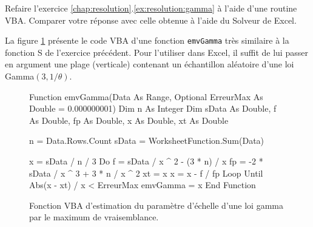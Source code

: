 \begin{exercice}
  Refaire l'exercice \ref{chap:resolution}.\ref{ex:resolution:gamma} à
  l'aide d'une routine VBA. Comparer votre réponse avec celle obtenue
  à l'aide du Solveur de Excel.
  \begin{sol}
    La figure \ref{fig:resolution:emvGamma} présente le code VBA d'une fonction
    \texttt{emvGamma} très similaire à la fonction S de l'exercice
    précédent. Pour l'utiliser dans Excel, il suffit de lui passer en
    argument une plage (verticale) contenant un échantillon aléatoire
    d'une loi Gamma$(3, 1/\theta)$.
    \begin{figure}
      \centering
      \begin{framed}
\begin{Scode}
Function emvGamma(Data As Range, Optional ErreurMax
                  As Double = 0.000000001)
    Dim n As Integer
    Dim sData As Double, f As Double,
        fp As Double, x As Double, xt As Double

    n = Data.Rows.Count
    sData = WorksheetFunction.Sum(Data)

    x = sData / n / 3
    Do
        f = sData / x ^ 2 - (3 * n) / x
        fp = -2 * sData / x ^ 3 + 3 * n / x ^ 2
        xt = x
        x = x - f / fp
    Loop Until Abs(x - xt) / x < ErreurMax
    emvGamma = x
End Function
\end{Scode}
      \end{framed}
      \caption{Fonction VBA d'estimation du paramètre d'échelle d'une
        loi gamma par le maximum de vraisemblance.}
      \label{fig:resolution:emvGamma}
    \end{figure}
  \end{sol}

\end{exercice}

